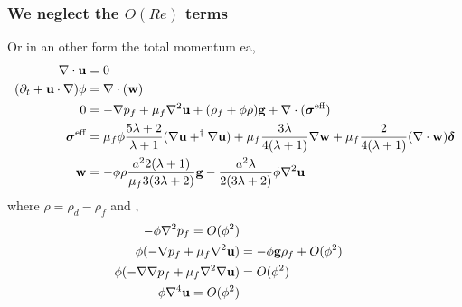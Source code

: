 \subsubsection{We neglect the $O(Re)$ terms}
Or in an other form the total momentum ea,
\begin{align}
    \mathbf{\nabla}\cdot \textbf{u}  &= 0\\
    (\partial_t + \textbf{u}\cdot \mathbf{\nabla}) \phi &= \mathbf{\nabla}\cdot(\textbf{w})\\
    0 &= 
    - \mathbf{\nabla} p_f 
    + \mu_f \mathbf{\nabla}^2\textbf{u}
    + (\rho_f +\phi \rho)\textbf{g}
    + \mathbf{\nabla}\cdot (\bm\sigma^\text{eff}) \\
    \bm\sigma^\text{eff}
    &=
     \mu_f \phi \frac{5\lambda +2}{\lambda+1} (\mathbf{\nabla}\textbf{u}+^\dagger \mathbf{\nabla} \textbf{u})
    + \mu_f \frac{3\lambda}{4(\lambda+1)} 
    \mathbf{\nabla}\textbf{w}
    + \mu_f \frac{ 2}{4(\lambda+1)} (\mathbf{\nabla}\cdot\textbf{w} ) \bm\delta\\
    \textbf{w} &= - \phi \rho \frac{a^22(\lambda+1)}{\mu_f 3(3\lambda+2)}\textbf{g} - \frac{a^2\lambda}{2(3\lambda+2)} \phi \mathbf{\nabla}^2 \textbf{u} \\
\end{align} 
where $\rho = \rho_d - \rho_f$ and , 
\begin{align}
    - \phi \mathbf{\nabla}^2 p_f = O(\phi^2)\\
    \phi (-\mathbf{\nabla} p_f+\mu_f \mathbf{\nabla}^2 \textbf{u} )
    &=
    -\phi \textbf{g}\rho_f
    + O(\phi^2)\\
    \phi (-\mathbf{\nabla}\mathbf{\nabla} p_f+\mu_f \mathbf{\nabla}^2 \mathbf{\nabla}\textbf{u} )
    &=
    O(\phi^2)\\
    \phi \mathbf{\nabla}^4 \textbf{u}
    =
    O(\phi^2)
\end{align}  

